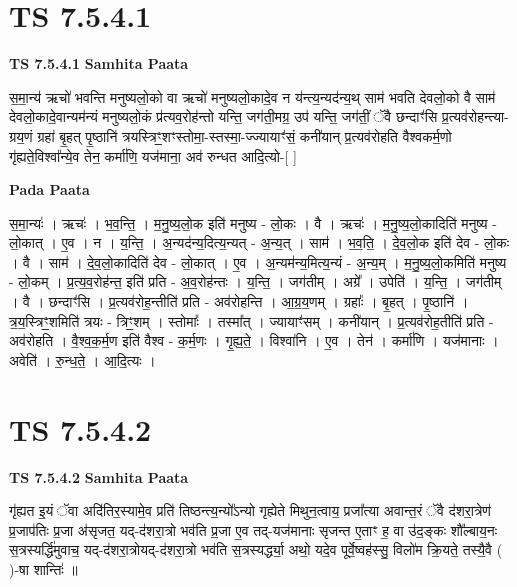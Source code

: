 \documentclass[17pt]{extarticle}
\begin{document}
\section*{ TS 7.5.4.1 }

\textbf{TS 7.5.4.1 } \newline
\textbf{Samhita Paata} \newline

स॒मा॒न्य॑ ऋचो॑ भवन्ति मनुष्यलो॒को वा ऋचो॑ मनुष्यलो॒कादे॒व न य॑न्त्य॒न्यद॑न्य॒थ् साम॑ भवति देवलो॒को वै साम॑ देवलो॒कादे॒वान्यम॑न्यं मनुष्यलो॒कं प्र॑त्यव॒रोह॑न्तो यन्ति॒ जग॑ती॒मग्र॒ उप॑ यन्ति॒ जग॑तीं॒ ॅवै छन्दाꣳ॑सि प्र॒त्यव॑रोहन्त्या-ग्रय॒णं ग्रहा॑ बृ॒हत् पृ॒ष्ठानि॑ त्रयस्त्रिꣳ॒॒शꣳस्तोमा॒-स्तस्मा॒-ज्ज्यायाꣳ॑सं॒ कनी॑यान् प्र॒त्यव॑रोहति वैश्वकर्म॒णो गृ॑ह्यते॒विश्वा᳚न्ये॒व तेन॒ कर्मा॑णि॒ यज॑माना॒ अव॑ रुन्धत आदि॒त्यो-[  ] \newline

\textbf{Pada Paata} \newline

स॒मा॒न्यः॑ । ऋचः॑ । भ॒व॒न्ति॒ । म॒नु॒ष्य॒लो॒क इति॑ मनुष्य - लो॒कः । वै । ऋचः॑ । म॒नु॒ष्य॒लो॒कादिति॑ मनुष्य - लो॒कात् । ए॒व । न । य॒न्ति॒ । अ॒न्यद॑न्य॒दित्य॒न्यत् - अ॒न्य॒त् । साम॑ । भ॒व॒ति॒ । दे॒व॒लो॒क इति॑ देव - लो॒कः । वै । साम॑ । दे॒व॒लो॒कादिति॑ देव - लो॒कात् । ए॒व । अ॒न्यम॑न्य॒मित्य॒न्यं - अ॒न्य॒म् । म॒नु॒ष्य॒लो॒कमिति॑ मनुष्य - लो॒कम् । प्र॒त्य॒व॒रोह॑न्त॒ इति॑ प्रति - अ॒व॒रोह॑न्तः । य॒न्ति॒ । जग॑तीम् । अग्रे᳚ । उपेति॑ । य॒न्ति॒ । जग॑तीम् । वै । छन्दाꣳ॑सि । प्र॒त्यव॑रोह॒न्तीति॑ प्रति - अव॑रोहन्ति । आ॒ग्र॒य॒णम् । ग्रहाः᳚ । बृ॒हत् । पृ॒ष्ठानि॑ । त्र॒य॒स्त्रिꣳ॒॒शमिति॑ त्रयः - त्रिꣳ॒॒शम् । स्तोमाः᳚ । तस्मा᳚त् । ज्यायाꣳ॑सम् । कनी॑यान् । प्र॒त्यव॑रोह॒तीति॑ प्रति - अव॑रोहति । वै॒श्व॒क॒र्म॒ण इति॑ वैश्व - क॒र्म॒णः । गृ॒ह्य॒ते॒ । विश्वा॑नि । ए॒व । तेन॑ । कर्मा॑णि । यज॑मानाः । अवेति॑ । रु॒न्ध॒ते॒ । आ॒दि॒त्यः ।  \newline




\section*{ TS 7.5.4.2 }

\textbf{TS 7.5.4.2 } \newline
\textbf{Samhita Paata} \newline

गृ॑ह्यत इ॒यं ॅवा अदि॑तिर॒स्यामे॒व प्रति॑ तिष्ठन्त्य॒न्यो᳚ऽन्यो गृह्येते मिथुन॒त्वाय॒ प्रजा᳚त्या अवान्त॒रं ॅवै द॑शरा॒त्रेण॑ प्र॒जाप॑तिः प्र॒जा अ॑सृजत॒ यद्-द॑शरा॒त्रो भव॑ति प्र॒जा ए॒व तद्-यज॑मानाः सृजन्त ए॒ताꣳ ह॒ वा उ॑द॒ङ्कः शौ᳚ल्बाय॒नः स॒त्रस्यर्द्धि॑मुवाच॒ यद्-द॑शरा॒त्रोयद्-द॑शरा॒त्रो भव॑ति स॒त्रस्यर्द्ध्या॒ अथो॒ यदे॒व पूर्वे॒ष्वह॑स्सु॒ विलो॑म क्रि॒यते॒ तस्यै॒वै ( )-षा शान्तिः॑ ॥ \newline
\end{document}
